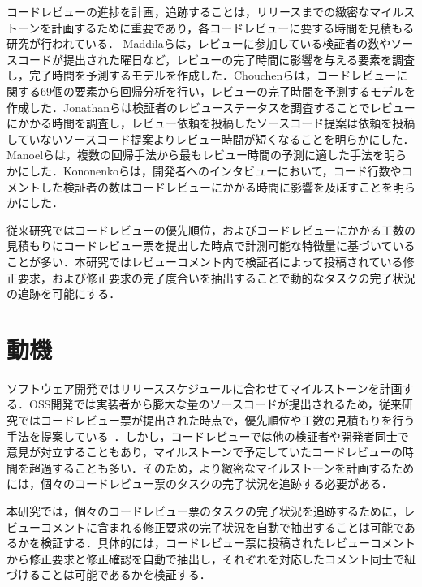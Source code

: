 \documentclass[11pt]{jreport}
\begin{document}
コードレビューの進捗を計画，追跡することは，リリースまでの緻密なマイルストーンを計画するために重要であり，各コードレビューに要する時間を見積もる研究が行われている．
Maddilaらは，レビューに参加している検証者の数やソースコードが提出された曜日など，レビューの完了時間に影響を与える要素を調査し，完了時間を予測するモデルを作成した\cite{estimate_time1}\cite{estimate_time2}．Chouchenらは，コードレビューに関する69個の要素から回帰分析を行い，レビューの完了時間を予測するモデルを作成した\cite{estimate_time3}．Jonathanらは検証者のレビューステータスを調査することでレビューにかかる時間を調査し，レビュー依頼を投稿したソースコード提案は依頼を投稿していないソースコード提案よりレビュー時間が短くなることを明らかにした\cite{estimate_time4}．Manoelらは，複数の回帰手法から最もレビュー時間の予測に適した手法を明らかにした\cite{estimate_time5}．Kononenkoらは，開発者へのインタビューにおいて，コード行数やコメントした検証者の数はコードレビューにかかる時間に影響を及ぼすことを明らかにした\cite{release_merge}．

従来研究ではコードレビューの優先順位，およびコードレビューにかかる工数の見積もりにコードレビュー票を提出した時点で計測可能な特徴量に基づいていることが多い．本研究ではレビューコメント内で検証者によって投稿されている修正要求，および修正要求の完了度合いを抽出することで動的なタスクの完了状況の追跡を可能にする．

\section{動機}
ソフトウェア開発ではリリーススケジュールに合わせてマイルストーンを計画する．OSS開発では実装者から膨大な量のソースコードが提出されるため，従来研究ではコードレビュー票が提出された時点で，優先順位や工数の見積もりを行う手法を提案している~\cite{estimate_time1}\cite{estimate_time2}\cite{estimate_time3}\cite{estimate_time4}\cite{estimate_time5}．しかし，コードレビューでは他の検証者や開発者同士で意見が対立することもあり，マイルストーンで予定していたコードレビューの時間を超過することも多い\cite{review_time1}\cite{review_time2}．そのため，より緻密なマイルストーンを計画するためには，個々のコードレビュー票のタスクの完了状況を追跡する必要がある．

本研究では，個々のコードレビュー票のタスクの完了状況を追跡するために，レビューコメントに含まれる修正要求の完了状況を自動で抽出することは可能であるかを検証する．具体的には，コードレビュー票に投稿されたレビューコメントから修正要求と修正確認を自動で抽出し，それぞれを対応したコメント同士で紐づけることは可能であるかを検証する．
\end{document}
